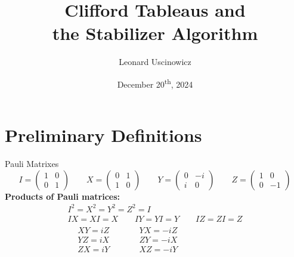 \documentclass[english,aspectratio=169]{tumbeamer}
\title{Clifford Tableaus and \\ the Stabilizer Algorithm}
\subtitle{}
\author{Leonard Uscinowicz}
\institute{\theChairName\\\theDepartmentName\\\theUniversityName}
\date[20/12/2024]{December 20\textsuperscript{th}, 2024}
\begin{document}
    \renewcommand{\theChairName}{\(\qquad\)}
    \renewcommand{\theDepartmentName}{\(\qquad\)}
    \maketitle


    \section{Preliminary Definitions}
    \label{sec:preliminary-definitions}
    \begin{frame}{Pauli Matrixes}
        \[
            I=\begin{pmatrix}
                  1 & 0 \\ 0 & 1
            \end{pmatrix}
            \qquad
            X=\begin{pmatrix}
                  0 & 1 \\ 1 & 0
            \end{pmatrix}
            \qquad
            Y=\begin{pmatrix}
                  0 & -i \\ i & 0
            \end{pmatrix}
            \qquad
            Z=\begin{pmatrix}
                  1 & 0 \\ 0 & -1
            \end{pmatrix}
        \]
        \newline
        \textbf{Products of Pauli matrices:}
        \begin{gather*}
            I^2=X^2=Y^2=Z^2=I \\
            IX=XI=X
            \qquad
            IY=YI=Y
            \qquad
            IZ=ZI=Z \\
            \begin{aligned}
                &XY=iZ
                \qquad
                &&YX=-iZ \\
                &YZ=iX
                \qquad
                &&ZY=-iX \\
                &ZX=iY
                \qquad
                &&XZ=-iY
            \end{aligned}
        \end{gather*}
        \vspace*{4mm}

        {\footnotesize
        \cite*{02_ImprovedSimulationOfStabilizerCircuits}
        }
    \end{frame}
\end{document}
